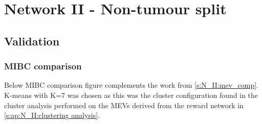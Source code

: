 \chapter{Network II - Non-tumour split}

\section{Validation} \label{ap:N_II:validation}

\subsection{MIBC comparison} \label{ap:N_II:val_mibc_comp}

Below MIBC comparison figure complements the work from \cref{s:N_II:mev_comp}. K-means with K=7 was chosen as this was the cluster configuration found in the cluster analysis performed on the MEVs derived from the reward network in \cref{s:ap:N_II:clustering analysis}.


